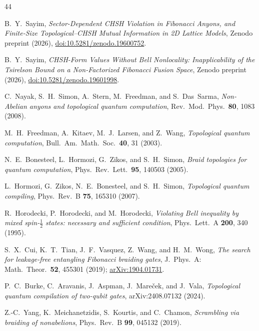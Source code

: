\documentclass[aps,pra,twocolumn,superscriptaddress,longbibliography,floatfix,nofootinbib]{revtex4-2}
\begin{document}
\begin{thebibliography}{44}

B.~Y.~Sayim,
\textit{Sector-Dependent CHSH Violation in Fibonacci Anyons,
and Finite-Size Topological--CHSH Mutual Information in 2D
Lattice Models},
Zenodo preprint (2026),
\href{https://doi.org/10.5281/zenodo.19600752}{doi:10.5281/zenodo.19600752}.

B.~Y.~Sayim,
\textit{CHSH-Form Values Without Bell Nonlocality: Inapplicability of the
Tsirelson Bound on a Non-Factorized Fibonacci Fusion Space},
Zenodo preprint (2026),
\href{https://doi.org/10.5281/zenodo.19601998}{doi:10.5281/zenodo.19601998}.

C.~Nayak, S.~H.~Simon, A.~Stern, M.~Freedman, and S.~Das~Sarma,
\textit{Non-Abelian anyons and topological quantum computation},
Rev.\ Mod.\ Phys.\ \textbf{80}, 1083 (2008).

M.~H.~Freedman, A.~Kitaev, M.~J.~Larsen, and Z.~Wang,
\textit{Topological quantum computation},
Bull.\ Am.\ Math.\ Soc.\ \textbf{40}, 31 (2003).

N.~E.~Bonesteel, L.~Hormozi, G.~Zikos, and S.~H.~Simon,
\textit{Braid topologies for quantum computation},
Phys.\ Rev.\ Lett.\ \textbf{95}, 140503 (2005).

L.~Hormozi, G.~Zikos, N.~E.~Bonesteel, and S.~H.~Simon,
\textit{Topological quantum compiling},
Phys.\ Rev.\ B \textbf{75}, 165310 (2007).

R.~Horodecki, P.~Horodecki, and M.~Horodecki,
\textit{Violating Bell inequality by mixed spin-$\frac{1}{2}$
states: necessary and sufficient condition},
Phys.\ Lett.\ A \textbf{200}, 340 (1995).

S.~X.~Cui, K.~T.~Tian, J.~F.~Vasquez, Z.~Wang, and H.~M.~Wong,
\textit{The search for leakage-free entangling Fibonacci braiding gates},
J.\ Phys.\ A: Math.\ Theor.\ \textbf{52}, 455301 (2019);
\href{https://arxiv.org/abs/1904.01731}{arXiv:1904.01731}.

P.~C.~Burke, C.~Aravanis, J.~Aspman, J.~Mare\v{c}ek, and J.~Vala,
\textit{Topological quantum compilation of two-qubit gates},
arXiv:2408.07132 (2024).

Z.-C.~Yang, K.~Meichanetzidis, S.~Kourtis, and C.~Chamon,
\textit{Scrambling via braiding of nonabelions},
Phys.\ Rev.\ B \textbf{99}, 045132 (2019).


\end{thebibliography}
\end{document}
